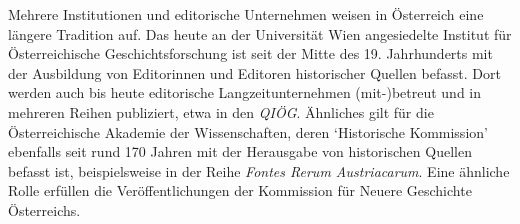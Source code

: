 \documentclass{article}
\begin{document}
        Mehrere Institutionen und editorische Unternehmen weisen in Österreich eine
                  längere Tradition auf. Das heute an der Universität Wien angesiedelte Institut für
                  Österreichische Geschichtsforschung ist seit der Mitte des 19. Jahrhunderts mit
                  der Ausbildung von Editorinnen und Editoren historischer Quellen befasst. Dort
                  werden auch bis heute editorische Langzeitunternehmen (mit-)betreut und in
                  mehreren Reihen publiziert, etwa in den \emph{QIÖG}. Ähnliches
                  gilt für die Österreichische Akademie der Wissenschaften, deren ‘Historische
                  Kommission’ ebenfalls seit rund 170 Jahren mit der Herausgabe von historischen
                  Quellen befasst ist, beispielsweise in der Reihe \emph{Fontes Rerum
                     Austriacarum}. Eine ähnliche Rolle erfüllen die Veröffentlichungen der
                  Kommission für Neuere Geschichte Österreichs.\\
            
\end{document}
